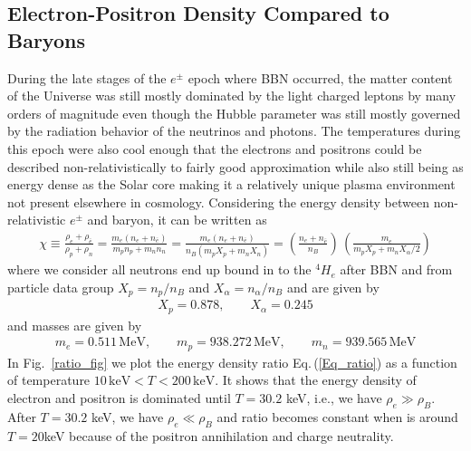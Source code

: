 \documentclass[universe,article,submit,moreauthors,pdftex,a4paper]{Definitions/mdpi}
\newcommand{\req}[1]{Eq.\,(\ref{#1})}
\newcommand*{\rf}[1]{Fig.~{\ref{#1}}}
\begin{document}
\subsection{Electron-Positron Density Compared to Baryons}\label{sec:ElectronPositronDensity}
\noindent During the late stages of the $e^{\pm}$ epoch where BBN occurred, the matter content of the Universe was still mostly dominated by the light charged leptons by many orders of magnitude even though the Hubble parameter was still mostly governed by the radiation behavior of the neutrinos and photons. The temperatures during this epoch were also cool enough that the electrons and positrons could be described non-relativistically to fairly good approximation while also still being as energy dense as the Solar core making it a relatively unique plasma environment not present elsewhere in cosmology. Considering the energy density between non-relativistic $e^{\pm}$ and baryon, it can be written as
\begin{align}\label{Eq_ratio}
\chi\equiv\frac{\rho_e+\rho_{\bar e}}{\rho_p+\rho_n}=\frac{m_e(n_e+n_{\bar e})}{m_pn_p+m_n n_n}=\frac{m_e(n_e+n_{\bar e})}{n_B(m_pX_p+m_nX_n)}=\left(\frac{n_e+n_{\bar e}}{n_B}\right)\,\left(\frac{m_e}{m_pX_p+{m_n X_\alpha}/2}\right)
\end{align}
where we consider all neutrons end up bound in to the $^4H_e$ after BBN  and from particle data group $X_p=n_p/n_B$ and $X_\alpha=n_\alpha/n_B$ and are given by
\begin{align}
X_p=0.878,\qquad X_\alpha=0.245
\end{align}
and masses are given by
\begin{align}
m_e=0.511\,\mathrm{MeV}, \qquad m_p=938.272\,\mathrm{MeV},\qquad m_n=939.565\,\mathrm{MeV}
\end{align}
In \rf{ratio_fig} we plot the energy density ratio \req{Eq_ratio} as a function of temperature $10\,\mathrm{keV}< T<200\,\mathrm{keV}$. It shows that the energy density of electron and positron is dominated until $T=30.2$ keV, i.e.,  we have $\rho_{e}\gg\rho_B$. After $T=30.2$ keV, we have $\rho_{e}\ll\rho_B$ and ratio becomes constant when is around $T=20$keV because of the positron annihilation and charge neutrality.
\end{document}
